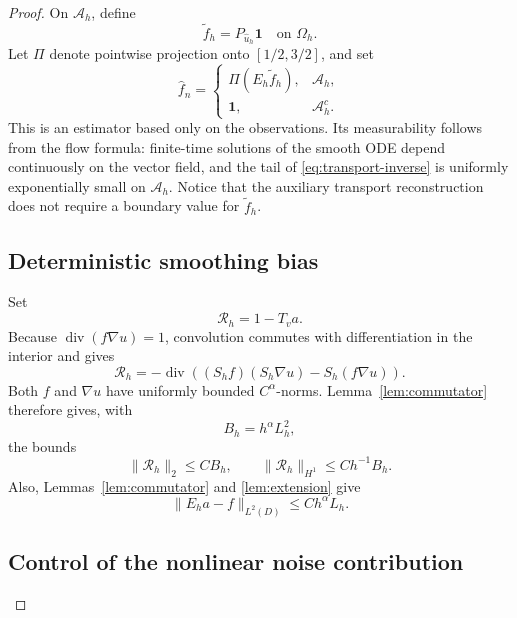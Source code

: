 \documentclass[11pt]{article}
\theoremstyle{remark}
\newcommand{\one}{\mathbf 1}
\DeclareMathOperator{\divergence}{div}
\begin{document}
\begin{proof}
On \(\mathcal A_h\), define
\[
\widetilde f_h=P_{\widehat u_h}\one
\quad\text{on }\Omega_h.
\]
Let \(\Pi\) denote pointwise projection onto \([1/2,3/2]\),  and set
\[
\widehat f_n=
\begin{cases}
\Pi(E_h\widetilde f_h),&\mathcal A_h,\\
\one,&\mathcal A_h^c.
\end{cases}
\]
This is an estimator based only on the observations.
Its measurability follows from the flow formula:
finite-time solutions of the smooth ODE depend continuously on the
vector field, and the tail of \eqref{eq:transport-inverse} is uniformly
exponentially small on \(\mathcal A_h\).
Notice that the auxiliary transport reconstruction does not require
a boundary value for \(\widetilde f_h\).


\subsection*{Deterministic smoothing bias}

Set
\[
\mathcal R_h=1-T_va.
\]
Because \(\divergence(f\nabla u)=1\), convolution commutes with
differentiation in the interior and gives
\[
\mathcal R_h
=-\divergence\left((S_hf)(S_h\nabla u)-S_h(f\nabla u)\right).
\]
Both \(f\) and \(\nabla u\) have uniformly bounded \(C^\alpha\)-norms.
Lemma~\ref{lem:commutator} therefore gives, with
\[
B_h=h^\alpha L_h^2,
\]
the bounds
\begin{equation}\label{eq:residual-bounds}
\|\mathcal R_h\|_2\leq CB_h,\qquad
\|\mathcal R_h\|_{H^1}\leq Ch^{-1}B_h.
\end{equation}
Also, Lemmas~\ref{lem:commutator} and \ref{lem:extension} give
\begin{equation}\label{eq:completed-bias}
\|E_ha-f\|_{L^2(D)}\leq Ch^\alpha L_h.
\end{equation}

\subsection*{Control of the nonlinear noise contribution}


\end{proof}
\end{document}
